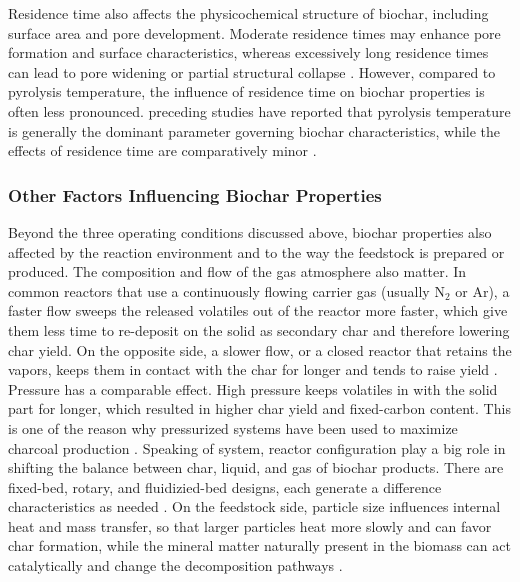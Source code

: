 \vspace{0.3em}

Residence time also affects the physicochemical structure of biochar, including surface area and pore development. Moderate residence times may enhance pore formation and surface characteristics, whereas excessively long residence times can lead to pore widening or partial structural collapse \cite{wang-2019}. However, compared to pyrolysis temperature, the influence of residence time on biochar properties is often less pronounced. preceding studies have reported that pyrolysis temperature is generally the dominant parameter governing biochar characteristics, while the effects of residence time are comparatively minor \cite{wang-2020, zhao-2017}.

\vspace{0.3em}
\subsubsection*{Other Factors Influencing Biochar Properties}
Beyond the three operating conditions discussed above, biochar properties also affected by the reaction environment and to the way the feedstock is prepared or produced. The composition and flow of the gas atmosphere also matter. In common reactors that use a continuously flowing carrier gas (usually N$_2$ or Ar), a faster flow sweeps the released volatiles out of the reactor more faster, which give them less time to re-deposit on the solid as secondary char and therefore lowering char yield. On the opposite side, a slower flow, or a closed reactor that retains the vapors, keeps them in contact with the char for longer and tends to raise yield \cite{Pahnila2023,manya-2012}. Pressure has a comparable effect. High pressure keeps volatiles in with the solid part for longer, which resulted in higher char yield and fixed-carbon content. This is one of the reason why pressurized systems have been used to maximize charcoal production \cite{antal-2003}. Speaking of system, reactor configuration play a big role in shifting the balance between char, liquid, and gas of biochar products. There are fixed-bed, rotary, and fluidizied-bed designs, each generate a difference characteristics as needed \cite{Pahnila2023,manya-2012}. On the feedstock side, particle size influences internal heat and mass transfer, so that larger particles heat more slowly and can favor char formation, while the mineral matter naturally present in the biomass can act catalytically and change the decomposition pathways \cite{leng-2018,Puri2024}.


